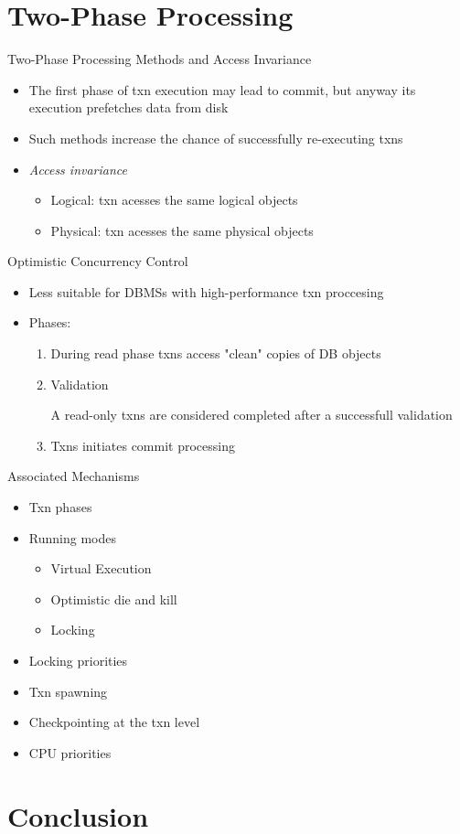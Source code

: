 \documentclass[sans]{beamer}
\begin{document}
\section{Two-Phase Processing}

\begin{frame}{Two-Phase Processing Methods and Access Invariance}
  \begin{itemize}
    \item The first phase of txn execution may lead to commit,
      but anyway its execution prefetches data from disk 
    \item Such methods increase the chance of successfully re-executing
      txns
    \item \emph{Access invariance}
      \begin{itemize}
        \item Logical: txn acesses the same logical objects
        \item Physical: txn acesses the same physical objects
      \end{itemize}
  \end{itemize}
\end{frame}

\begin{frame}{Optimistic Concurrency Control}
  \begin{itemize}
    \item Less suitable for DBMSs with high-performance txn proccesing
    \item Phases:
      \begin{enumerate}
        \item During read phase txns access "clean" copies of DB objects
        \item Validation

         A read-only txns are considered completed after a
          successfull validation
        \item Txns initiates commit processing
      \end{enumerate}
  \end{itemize}
\end{frame}

\begin{frame}{Associated Mechanisms}
  \begin{itemize}
    \item Txn phases
    \item Running modes
      \begin{itemize}
        \item Virtual Execution
        \item Optimistic die and kill
        \item Locking
      \end{itemize}
    \item Locking priorities
    \item Txn spawning
    \item Checkpointing at the txn level
    \item CPU priorities
  \end{itemize}
\end{frame}

\section{Conclusion}
\end{document}
